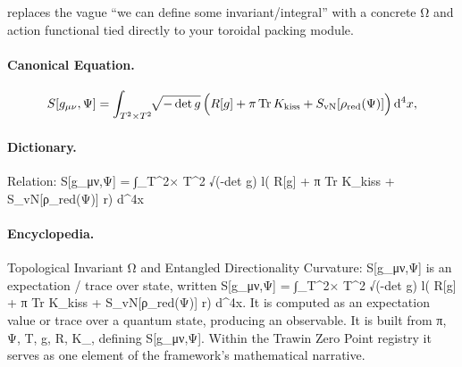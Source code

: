 replaces the vague “we can define some invariant/integral” with a concrete Ω and action functional tied directly to your toroidal packing module.

\paragraph{Canonical Equation.}
\[
S[g_{\mu\nu},\Psi] = \int_{T^2\times T^2} \!\!\sqrt{-\det g}\, \Bigl( R[g] + \pi\,\mathrm{Tr}\,K_{\mathrm{kiss}} + S_{\mathrm{vN}}[\rho_{\mathrm{red}}(\Psi)] \Bigr)\,\mathrm{d}^4x,
\]

\paragraph{Dictionary.}
Relation: S[g\_μν,Ψ] = ∫\_T\textasciicircum{}2× T\textasciicircum{}2 √(-det g) l( R[g] + π Tr K\_kiss + S\_vN[ρ\_red(Ψ)] r) d\textasciicircum{}4x

\paragraph{Encyclopedia.}
Topological Invariant Ω and Entangled Directionality Curvature: S[g\_μν,Ψ] is an expectation / trace over state, written S[g\_μν,Ψ] = ∫\_T\textasciicircum{}2× T\textasciicircum{}2 √(-det g) l( R[g] + π Tr K\_kiss + S\_vN[ρ\_red(Ψ)] r) d\textasciicircum{}4x. It is computed as an expectation value or trace over a quantum state, producing an observable. It is built from π, Ψ, T, g, R, K\_, defining S[g\_μν,Ψ]. Within the Trawin Zero Point registry it serves as one element of the framework's mathematical narrative.
